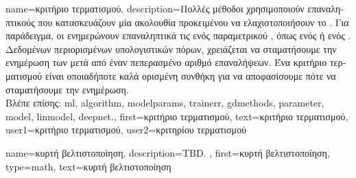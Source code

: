 {name={\foreignlanguage{greek}{κριτήριο τερματισμού}},
	description={\foreignlanguage{greek}{Πολλές μέθοδοι} 
		 \foreignlanguage{greek}{χρησιμοποι\-ούν επαναληπτικούς}  
		\foreignlanguage{greek}{που κατασκευάζουν μία ακολουθία}  
		\foreignlanguage{greek}{προκειμένου να ελαχιστοποιήσουν το} . 
		\foreignlanguage{greek}{Για παράδειγμα, οι}  \foreignlanguage{greek}{ενημερώνουν 
		επαναληπτικά τις}  \foreignlanguage{greek}{ενός παραμετρικού} , 
		\foreignlanguage{greek}{όπως ενός}  \foreignlanguage{greek}{ή ενός} . 
		\foreignlanguage{greek}{Δεδομένων περιορισμένων υπολογιστικών πόρων, χρειάζεται να σταματήσουμε
		την ενημέρωση των}  \foreignlanguage{greek}{μετά από έναν
		πεπερασμένο αριθμό επαναλήψεων. Ένα κριτήριο τερματισμού είναι οποιαδήποτε καλά ορισμένη συνθήκη
		για να αποφασίσουμε πότε να σταματήσουμε την ενημέρωση.}  \\
		\foreignlanguage{greek}{Βλέπε επίσης:} \gls{ml}, \gls{algorithm}, \glspl{modelparam}, \gls{trainerr}, \gls{gdmethods}, 
		\gls{parameter}, \gls{model}, \gls{linmodel}, \gls{deepnet}.},
	first={\foreignlanguage{greek}{κριτήριο τερματισμού}},
	text={\foreignlanguage{greek}{κριτήριο τερματισμού}},
	user1={\foreignlanguage{greek}{κριτήριο τερματισμού}}, %
	user2={\foreignlanguage{greek}{κριτηρίου τερματισμού}} %
}

{name={\foreignlanguage{greek}{κυρτή βελτιστοποίηση}},
 	description={TBD. 
  },
	first={\foreignlanguage{greek}{κυρτή βελτιστοποίηση}},
	type=math,
  	text={\foreignlanguage{greek}{κυρτή βελτιστοποίηση}}
}

